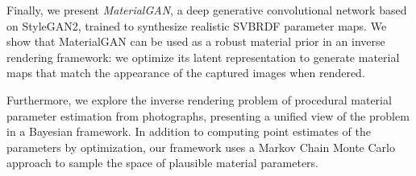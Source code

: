 {  Finally, we present \emph{MaterialGAN}, a deep generative convolutional network based on StyleGAN2, trained to synthesize realistic SVBRDF parameter maps. We show that MaterialGAN can be used as a robust material prior in an inverse rendering framework: we optimize its latent representation to generate material maps that match the appearance of the captured images when rendered. 

  Furthermore, we explore the inverse rendering problem of procedural material parameter estimation from photographs, presenting a unified view of the problem in a Bayesian framework. In addition to computing point estimates of the parameters by optimization, our framework uses a Markov Chain Monte Carlo approach to sample the space of plausible material parameters.
}


